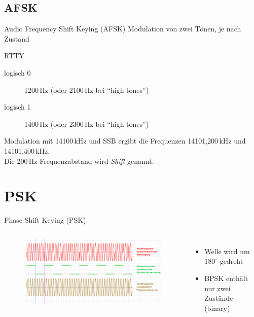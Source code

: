 \subsection{AFSK}
\begin{frame}{Audio Frequency Shift Keying (AFSK)}
  Modulation von zwei Tönen, je nach Zustand
  \begin{exampleblock}{RTTY}
    \begin{description}
      \item[logisch 0] 1200\,Hz (oder 2100\,Hz bei ``high tones'')
      \item[logisch 1] 1400\,Hz (oder 2300\,Hz bei ``high tones'')
    \end{description}
    Modulation mit 14100\,kHz und SSB ergibt die Frequenzen 14101,200\,kHz und 14101,400\,kHz.\\
    Die 200\,Hz Frequenzabstand wird \emph{Shift} genannt.
  \end{exampleblock}
\end{frame}

\section{PSK}
\begin{frame}{Phase Shift Keying (PSK)}
  \begin{columns}
    \begin{figure}
      \includegraphics[width=\textwidth,height=.8\textheight,keepaspectratio]{a15/Phase_modulation_(PHM).png}
    \end{figure}
    \begin{itemize}
      \item Welle wird um $180^\circ$ gedreht
      \item BPSK enthält nur zwei Zustände (binary)
    \end{itemize}
  \end{columns}
\end{frame}

